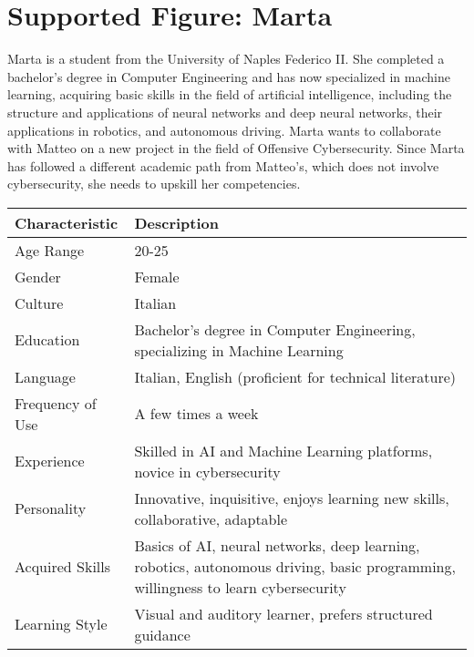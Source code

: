 \newpage
\section{Supported Figure: Marta}
Marta is a student from the University of Naples Federico II. She completed a bachelor's degree in Computer Engineering and has now specialized in machine learning, acquiring basic skills in the field of artificial intelligence, including the structure and applications of neural networks and deep neural networks, their applications in robotics, and autonomous driving. Marta wants to collaborate with Matteo on a new project in the field of Offensive Cybersecurity. Since Marta has followed a different academic path from Matteo's, which does not involve cybersecurity, she needs to upskill her competencies.

\begin{center}
    \begin{tabular}{|l|p{10cm}|}
    \hline
    \textbf{Characteristic} & \textbf{Description} \\
    \hline
    Age Range & 20-25 \\
    \hline
    Gender & Female \\
    \hline
    Culture & Italian \\
    \hline
    Education & Bachelor's degree in Computer Engineering, specializing in Machine Learning \\
    \hline
    Language & Italian, English (proficient for technical literature) \\
    \hline
    Frequency of Use & A few times a week \\
    \hline
    Experience & Skilled in AI and Machine Learning platforms, novice in cybersecurity \\
    \hline
    Personality & Innovative, inquisitive, enjoys learning new skills, collaborative, adaptable \\
    \hline
    Acquired Skills & Basics of AI, neural networks, deep learning, robotics, autonomous driving, basic programming, willingness to learn cybersecurity \\
    \hline
    Learning Style & Visual and auditory learner, prefers structured guidance \\
    \hline
    \end{tabular}
    \end{center}